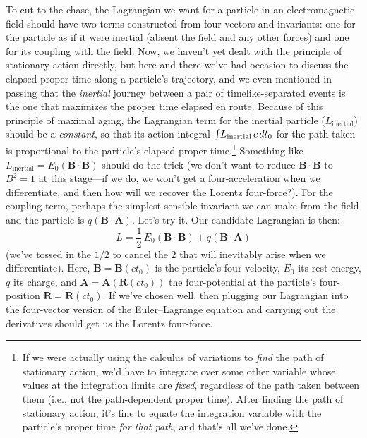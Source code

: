 \documentclass[12pt]{article}
\renewcommand{\vv}[1]{\mathbf{#1}}
\begin{document}
To cut to the chase, the Lagrangian we want for a particle in an electromagnetic field should have two terms constructed from four-vectors and invariants: one for the particle as if it were inertial (absent the field and any other forces) and one for its coupling with the field. Now, we haven't yet dealt with the principle of stationary action directly, but here and there we've had occasion to discuss the elapsed proper time along a particle's trajectory, and we even mentioned in passing that the \emph{inertial} journey between a pair of timelike-separated events is the one that maximizes the proper time elapsed en route. Because of this principle of maximal aging, the Lagrangian term for the inertial particle ($L_{\textrm{inertial}}$) should be a \emph{constant}, so that its action integral $\int \mkern-4mu L_{\textrm{inertial}} \, c \, dt_0$ for the path taken is proportional to the particle's elapsed proper time.\footnote{If we were actually using the calculus of variations to \emph{find} the path of stationary action, we'd have to integrate over some other variable whose values at the integration limits are \emph{fixed}, regardless of the path taken between them (i.e., not the path-dependent proper time). After finding the path of stationary action, it's fine to equate the integration variable with the particle's proper time \emph{for that path}, and that's all we've done.} Something like $L_{\textrm{inertial}} = E_0 (\vv B \cdot \vv B)$ should do the trick (we don't want to reduce $\vv B \cdot \vv B$ to $B^2 = 1$ at this stage---if we do, we won't get a four-acceleration when we differentiate, and then how will we recover the Lorentz four-force?). For the coupling term, perhaps the simplest sensible invariant we can make from the field and the particle is $q (\vv B \cdot \vv A)$. Let's try it. Our candidate Lagrangian is then:
\begin{equation*}
L = \dfrac{1}{2} \, E_0 (\vv B \cdot \vv B) + q (\vv B \cdot \vv A)
\end{equation*}
(we've tossed in the $1/2$ to cancel the $2$ that will inevitably arise when we differentiate). Here, $\vv B = \vv B (ct_0)$ is the particle's four-velocity, $E_0$ its rest energy, $q$ its charge, and $\vv A = \vv A (\vv R (ct_0))$ the four-potential at the particle's four-position $\vv R = \vv R (ct_0)$. If we've chosen well, then plugging our Lagrangian into the four-vector version of the Euler--Lagrange equation and carrying out the derivatives should get us the Lorentz four-force.
\end{document}
